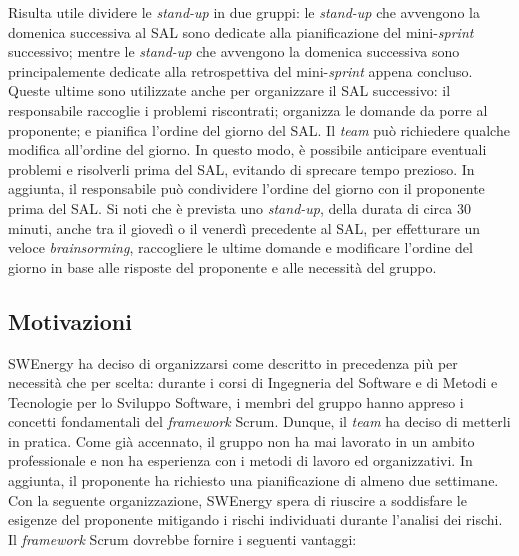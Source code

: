 Risulta utile dividere le \textit{stand-up} in due gruppi: le \textit{stand-up}
che avvengono la domenica successiva al SAL sono dedicate alla pianificazione
del mini-\textit{sprint} successivo; mentre le \textit{stand-up} che avvengono
la domenica successiva sono principalemente dedicate alla retrospettiva del
mini-\textit{sprint} appena concluso. Queste ultime sono utilizzate anche per
organizzare il SAL successivo: il responsabile raccoglie i problemi riscontrati;
organizza le domande da porre al proponente; e pianifica l'ordine del giorno del
SAL. Il \textit{team} può richiedere qualche modifica all'ordine del giorno. In
questo modo, è possibile anticipare eventuali problemi e risolverli prima del
SAL, evitando di sprecare tempo prezioso. In aggiunta, il responsabile può
condividere l'ordine del giorno con il proponente prima del SAL. Si noti
che è prevista uno \textit{stand-up}, della durata di circa 30
minuti, anche tra il giovedì o il venerdì precedente al SAL, per effetturare un
veloce \textit{brainsorming}, raccogliere le ultime domande e modificare
l'ordine del giorno in base alle risposte del proponente e alle necessità del
gruppo.

\subsection{Motivazioni}

SWEnergy ha deciso di organizzarsi come descritto in precedenza più per
necessità che per scelta: durante i corsi di Ingegneria del Software e di Metodi
e Tecnologie per lo Sviluppo Software, i membri del gruppo hanno appreso i
concetti fondamentali del \textit{framework} Scrum. Dunque, il \textit{team} ha
deciso di metterli in pratica. Come già accennato, il gruppo non ha mai lavorato
in un ambito professionale e non ha esperienza con i metodi di lavoro ed
organizzativi. In aggiunta, il proponente ha richiesto una pianificazione di
almeno due settimane.
Con la seguente organizzazione, SWEnergy spera di riuscire a soddisfare le
esigenze del proponente mitigando i rischi individuati durante l'analisi dei
rischi. Il \textit{framework} Scrum dovrebbe fornire i seguenti vantaggi:

